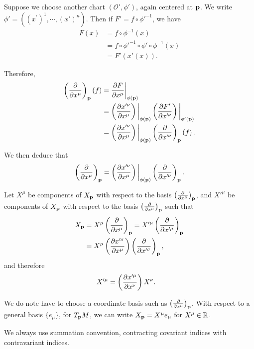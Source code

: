 Suppose we choose another chart $\left( \mathcal{O}', \phi' \right) $, again centered at $\vb{p}$. We write $\phi' = \left(\left( x^{'} \right)^{1}, \cdots, \left( x' \right)^{n}   \right) $. Then if $F' = f \circ \phi'^{-1}$, we have
\begin{align}
    F \left( x \right) &= f \circ \phi^{-1}\left( x \right) \\
    &= f \circ \phi'^{-1} \circ \phi'\circ \phi^{-1} \left( x \right) \\
    &= F' \left( x' \left( x \right)  \right)
.\end{align}

Therefore,
\begin{align}
    \left( \pdv{x^{\mu}} \right)_{\vb{p}} \left( f \right) &=  \pdv{F}{x^{\mu}} \bigg|_{\phi \left( \vb{p} \right) }\\
    &= \left( \pdv{x'^{\nu}}{x^{\mu}} \right) \bigg|_{\phi \left( \vb{p} \right) }  \left( \pdv{F'}{x'^{\nu}} \right) \bigg|_{\phi' \left( \vb{p} \right) } \\
    &= \left( \pdv{x'^{\nu}}{x^{\mu}} \right)  \bigg|_{\phi \left( \vb{p} \right) } \left( \pdv{x'^{\nu}} \right)_{\vb{p}} \left( f \right)
.\end{align}

We then deduce that
\begin{align}
    \left( \pdv{x^{\mu}} \right)_{\vb{p}} = \left( \pdv{x'^{\nu}}{x^{\mu}} \right) \bigg|_{\phi \left( \vb{p} \right) } \left( \pdv{x'^{\nu}} \right)_{\vb{p}} 
.\end{align}

Let $X^{\mu}$ be components of $X_{\vb{p}}$ with respect to the basis $\left( \pdv{x^{\mu}} \right)_{\vb{p}}$, and $X'^{\mu}$ be components of $X_{\vb{p}}$ with respect to the basis $\left( \pdv{x^{\mu}} \right)_{\vb{p}} $ such that
\begin{align}
    X_{\vb{p}} &= X^{\mu} \left( \pdv{x^{\mu}} \right)_{\vb{p}}  = X'^{\mu} \left( \pdv{x'^{\mu}} \right)_{\vb{p}} \\
    &= X^{\mu} \left( \pdv{x'^{\sigma}}{x^{\mu}} \right) \left( \pdv{x'^{\sigma}} \right)_{\vb{p}}
,\end{align}
and therefore
\begin{align}
    X'^{\mu} &= \left( \pdv{x'^{\mu}}{x^{\nu}} \right) X^{\nu}
.\end{align}

\begin{note}
    We do note have to choose a coordinate basis such as $\left( \pdv{x^{\mu}} \right)_{\vb{p}}$. With respect to a general basis $\{e_{\mu}\} $, for $T_{\vb{p}}M$, we can write $X_{\vb{p}}= X^{\mu} e_{\mu}$ for $X^{\mu} \in \mathbb{R}$.

    We always use summation convention, contracting covariant indices with contravariant indices.
\end{note}

